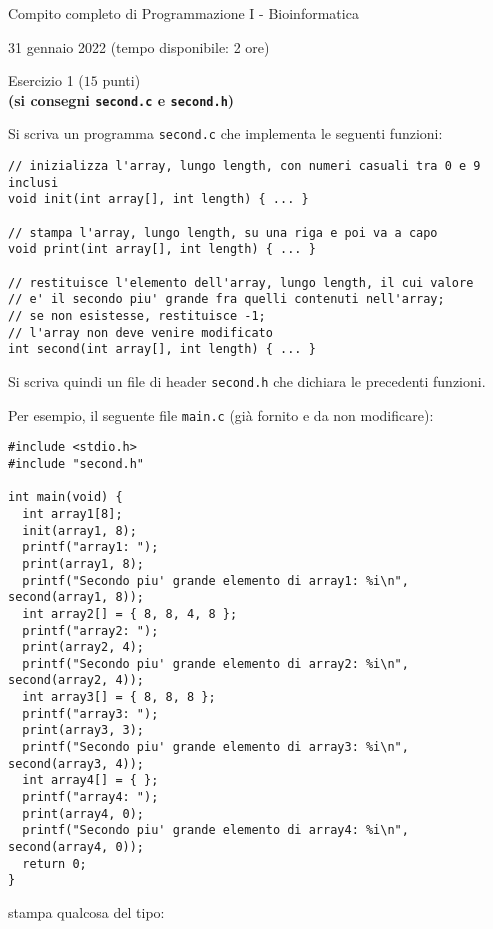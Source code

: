 \documentclass[12pt]{article}
\begin{document}
\begin{center}{\LARGE Compito completo di Programmazione I - Bioinformatica}\\
\begin{center}
  \large 31 gennaio 2022 (tempo disponibile: 2 ore)
\end{center}
\end{center}

\vspace*{1ex}
\begin{center}{\Large Esercizio 1} ($15$ punti)\\
  \textbf{(si consegni \texttt{second.c} e \texttt{second.h})}
\end{center}

Si scriva un programma \texttt{second.c} che implementa le seguenti funzioni:

\begin{center}
\begin{lstlisting}[language=myC]
// inizializza l'array, lungo length, con numeri casuali tra 0 e 9 inclusi
void init(int array[], int length) { ... }

// stampa l'array, lungo length, su una riga e poi va a capo
void print(int array[], int length) { ... }

// restituisce l'elemento dell'array, lungo length, il cui valore
// e' il secondo piu' grande fra quelli contenuti nell'array;
// se non esistesse, restituisce -1;
// l'array non deve venire modificato
int second(int array[], int length) { ... }
\end{lstlisting}
\end{center}
%
Si scriva quindi un file di header \texttt{second.h} che dichiara le precedenti funzioni.

Per esempio, il seguente file \texttt{main.c}
(gi\`a fornito e da non modificare):

\begin{center}
  \begin{lstlisting}[language=myC]
#include <stdio.h>
#include "second.h"

int main(void) {
  int array1[8];
  init(array1, 8);
  printf("array1: ");
  print(array1, 8);
  printf("Secondo piu' grande elemento di array1: %i\n", second(array1, 8));
  int array2[] = { 8, 8, 4, 8 };
  printf("array2: ");
  print(array2, 4);
  printf("Secondo piu' grande elemento di array2: %i\n", second(array2, 4));
  int array3[] = { 8, 8, 8 };
  printf("array3: ");
  print(array3, 3);
  printf("Secondo piu' grande elemento di array3: %i\n", second(array3, 4));
  int array4[] = { };
  printf("array4: ");
  print(array4, 0);
  printf("Secondo piu' grande elemento di array4: %i\n", second(array4, 0));
  return 0;
}
  \end{lstlisting}
\end{center}
stampa qualcosa del tipo:
\end{document}
